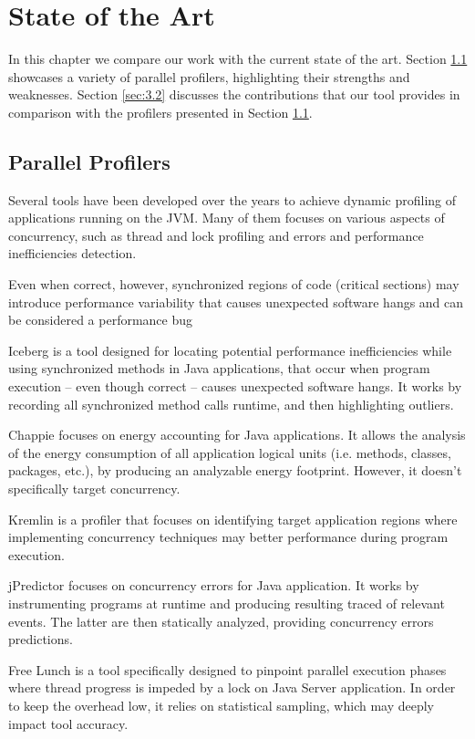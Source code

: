 \documentclass[]{usiinfthesis}
\begin{document}
\chapter{State of the Art} \label{chap:3}
In this chapter we compare our work with the current state of the art. Section \ref{sec:3.1} showcases a variety of parallel profilers, highlighting their strengths and weaknesses. Section \ref{sec:3.2} discusses the contributions that our tool provides in comparison with the profilers presented in Section \ref{sec:3.1}.

\section{Parallel Profilers} \label{sec:3.1}
Several tools have been developed over the years to achieve dynamic profiling of applications running on the JVM. Many of them focuses on various aspects of concurrency, such as thread and lock profiling and errors and performance inefficiencies detection.

Even when correct, however, synchronized regions of code (critical sections) may introduce performance variability that causes unexpected software hangs and can be considered a performance bug

Iceberg \cite{Iceberg} is a tool designed for locating potential performance inefficiencies while using synchronized methods in Java applications, that occur when program execution -- even though correct -- causes unexpected software hangs. It works by recording all synchronized method calls runtime, and then highlighting outliers.

Chappie \cite{Chappie} focuses on energy accounting for Java applications. It allows the analysis of the energy consumption of all application logical units (i.e. methods, classes, packages, etc.), by producing an analyzable energy footprint. However, it doesn't specifically target concurrency.

Kremlin \cite{Kremlin} is a profiler that focuses on identifying target application regions where implementing concurrency techniques may better performance during program execution. 

jPredictor \cite{jPredictor} focuses on concurrency errors for Java application. It works by instrumenting programs at runtime and producing resulting traced of relevant events. The latter are then statically analyzed, providing concurrency errors predictions.

Free Lunch \cite{FreeLunch} is a tool specifically designed to pinpoint parallel execution phases where thread progress is impeded by a lock on Java Server application. In order to keep the overhead low, it relies on statistical sampling, which may deeply impact tool accuracy.
\end{document}
